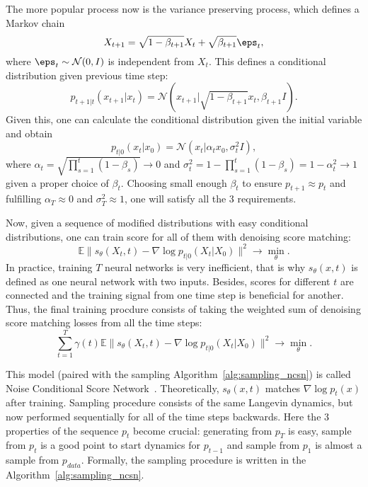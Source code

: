 The more popular process now is the variance preserving process, which defines a Markov chain
\begin{equation}\label{eq:vp_process}
    X_{t + 1} = \sqrt{1 - \beta_{t + 1}} X_t + \sqrt{\beta_{t + 1}} \eps_t,    
\end{equation}
where $\eps_t \sim \mathcal{N}(0, I)$ is independent from $X_t$. This defines a conditional distribution given previous time step:
\[
    p_{t + 1 | t}(x_{t + 1} | x_t) = \mathcal{N}(x_{t + 1} | \sqrt{1 - \beta_{t + 1}} x_t, \beta_{t + 1} I).
\]
Given this, one can calculate the conditional distribution given the initial variable and obtain~\cite{ho2020denoising}
\[
    p_{t | 0}(x_t | x_0) = \mathcal{N}(x_t | \alpha_t x_0, \sigma^2_t I),
\]
where $\alpha_t = \sqrt{\prod_{s = 1}^{t} (1 - \beta_s)} \rightarrow 0$ and $\sigma^2_t = 1 - \prod_{s = 1}^{t}(1 - \beta_s) = 1 - \alpha_t^2 \rightarrow 1$ given a proper choice of $\beta_t$. Choosing small enough $\beta_t$ to ensure $p_{t + 1} \approx p_{t}$ and fulfilling $\alpha_T \approx 0$ and $\sigma_T^2 \approx 1$, one will satisfy all the 3 requirements.

Now, given a sequence of modified distributions with easy conditional distributions, one can train score for all of them with denoising score matching:
\[
    \mathbb{E}\|s_\theta(X_t, t) - \nabla \log p_{t | 0}(X_t | X_0) \|^2 \rightarrow \min\limits_{\theta}.
\]
In practice, training $T$ neural networks is very inefficient, that is why $s_\theta(x, t)$ is defined as one neural network with two inputs. Besides, scores for different $t$ are connected and the training signal from one time step is beneficial for another. Thus, the final training procdure consists of taking the weighted sum of denoising score matching losses from all the time steps:
\begin{equation}\label{eq:ncsn_training}
    \sum\limits_{t = 1}^{T} \gamma(t) \mathbb{E}\|s_\theta(X_t, t) - \nabla \log p_{t | 0}(X_t | X_0) \|^2 \rightarrow \min\limits_{\theta}.
\end{equation}

This model (paired with the sampling Algorithm~\ref{alg:sampling_ncsn}) is called Noise Conditional Score Network~\cite{song2019generative}. Theoretically, $s_{\theta}(x, t)$ matches $\nabla \log p_{t}(x)$ after training. Sampling procedure consists of the same Langevin dynamics, but now performed sequentially for all of the time steps backwards. Here the 3 properties of the sequence $p_t$ become crucial: generating from $p_T$ is easy, sample from $p_{t}$ is a good point to start dynamics for $p_{t - 1}$ and sample from $p_{1}$ is almost a sample from $p_{data}$. Formally, the sampling procedure is written in the Algorithm~\ref{alg:sampling_ncsn}.

